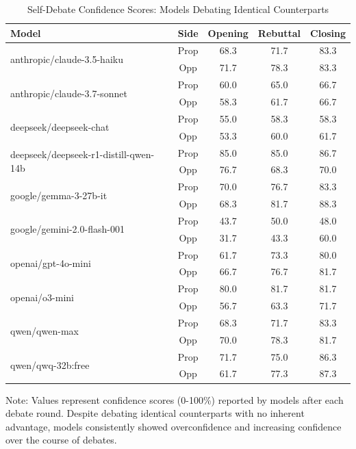 \documentclass{article}
\begin{document}
\begin{table}[htbp]
  \centering
  \caption{Self-Debate Confidence Scores: Models Debating Identical Counterparts}
  \label{tab:self-debate}
  \begin{tabular}{l|c|ccc}
      \toprule
      \textbf{Model} & \textbf{Side} & \textbf{Opening} & \textbf{Rebuttal} & \textbf{Closing} \\
      \midrule
      \multirow{2}{*}{anthropic/claude-3.5-haiku} & Prop & 68.3 & 71.7 & 83.3 \\
       & Opp & 71.7 & 78.3 & 83.3 \\
      \midrule
      \multirow{2}{*}{anthropic/claude-3.7-sonnet} & Prop & 60.0 & 65.0 & 66.7 \\
       & Opp & 58.3 & 61.7 & 66.7 \\
      \midrule
      \multirow{2}{*}{deepseek/deepseek-chat} & Prop & 55.0 & 58.3 & 58.3 \\
       & Opp & 53.3 & 60.0 & 61.7 \\
      \midrule
      \multirow{2}{*}{deepseek/deepseek-r1-distill-qwen-14b} & Prop & 85.0 & 85.0 & 86.7 \\
       & Opp & 76.7 & 68.3 & 70.0 \\
      \midrule
      \multirow{2}{*}{google/gemma-3-27b-it} & Prop & 70.0 & 76.7 & 83.3 \\
       & Opp & 68.3 & 81.7 & 88.3 \\
      \midrule
      \multirow{2}{*}{google/gemini-2.0-flash-001} & Prop & 43.7 & 50.0 & 48.0 \\
       & Opp & 31.7 & 43.3 & 60.0 \\
      \midrule
      \multirow{2}{*}{openai/gpt-4o-mini} & Prop & 61.7 & 73.3 & 80.0 \\
       & Opp & 66.7 & 76.7 & 81.7 \\
      \midrule
      \multirow{2}{*}{openai/o3-mini} & Prop & 80.0 & 81.7 & 81.7 \\
       & Opp & 56.7 & 63.3 & 71.7 \\
      \midrule
      \multirow{2}{*}{qwen/qwen-max} & Prop & 68.3 & 71.7 & 83.3 \\
       & Opp & 70.0 & 78.3 & 81.7 \\
      \midrule
      \multirow{2}{*}{qwen/qwq-32b:free} & Prop & 71.7 & 75.0 & 86.3 \\
       & Opp & 61.7 & 77.3 & 87.3 \\
      \bottomrule
  \end{tabular}
  \begin{tablenotes}
    \small
    \item Note: Values represent confidence scores (0-100\%) reported by models after each debate round. Despite debating identical counterparts with no inherent advantage, models consistently showed overconfidence and increasing confidence over the course of debates.
  \end{tablenotes}
\end{table}
\end{document}
